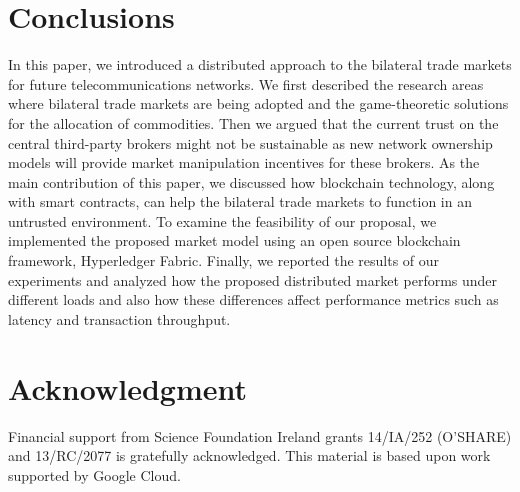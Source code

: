 \documentclass[conference]{IEEEtran}
\begin{document}
\section{Conclusions}
In this paper, we introduced a distributed approach to the bilateral trade markets for future telecommunications networks. We first described the research areas where bilateral trade markets are being adopted and the game-theoretic solutions for the allocation of commodities. Then we argued that the current trust on the central third-party brokers might not be sustainable as new network ownership models will provide market manipulation incentives for these brokers. As the main contribution of this paper, we discussed how blockchain technology, along with smart contracts, can help the bilateral trade markets to function in an untrusted environment. To examine the feasibility of our proposal, we implemented the proposed market model using an open source blockchain framework, Hyperledger Fabric. Finally, we reported the results of our experiments and analyzed how the proposed distributed market performs under different loads and also how these differences affect performance metrics such as latency and transaction throughput.
\section*{Acknowledgment}

Financial support from Science Foundation Ireland grants 14/IA/252 (O'SHARE) and 13/RC/2077 is gratefully acknowledged. This material is based upon work supported by Google Cloud.









\end{document}
